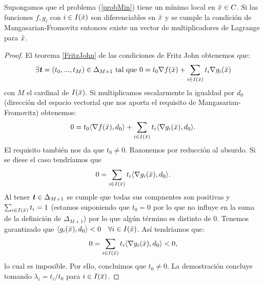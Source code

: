 		\begin{teoremaBox}
		Supongamos que el problema (\ref{probMin}) tiene un mínimo local en $ \bar{x} \in C $. Si las funciones $ f, g_i $ con $ i \in I(\bar{x}) $ son diferenciables en $ \bar{x} $ y se cumple la condición de Mangasarian-Fromovitz entonces existe un vector de multiplicadores de Lagrange para $ \bar{x} $.
		\end{teoremaBox} 
	
		\begin{proof}
		El teorema \ref{FritzJohn} de las condiciones de Fritz John obtenemos que:
		\[
		\exists \textbf{\emph{t}} = (t_0, ..., t_{M})\in \Delta_{M+1}  \text{ tal que }0 = t_0 \nabla f(\bar{x}) + \sum_{i \in I(\bar{x})}  t_i \nabla g_i (\bar{x})
		\]		
		con $ M $ el cardinal de $ I(\bar{x}) $. Si multiplicamos escalarmente la igualdad por $ d_0 $ (dirección del espacio vectorial que nos aporta el requisito de  Mangasarian-Fromovitz) obtenemos:
		\[
		0 = t_0 \langle \nabla f(\bar{x}), d_0 \rangle + \sum_{i \in I(\bar{x})}  t_i \langle \nabla g_i (\bar{x}), d_0 \rangle.
		\]
		El requisito también nos da que $ t_0 \neq 0$. Razonemos por reducción al absurdo. Si se diese el caso tendríamos que
		\[
		0 = \sum_{i \in I(\bar{x})}  t_i \langle \nabla g_i (\bar{x}), d_0 \rangle.
		\]
		Al tener $ \textbf{\emph{t}} \in \Delta_{M+1} $ se cumple que todas sus compnentes son positivas y $ \sum_{i \in I(\bar{x})}  t_i = 1 $ (estamos suponiendo que $ t_0 = 0 $ por lo que no influye en la suma de la definición de $ \Delta_{M+1} $) por lo que algún término es distinto de 0. Tenemos garantizado que $  \langle g_i (\bar{x}), d_0 \rangle < 0 \quad \forall i \in I(\bar{x}) $. Así tendríamos que:
			\[
		0 = \sum_{i \in I(\bar{x})}  t_i \langle \nabla g_i (\bar{x}), d_0 \rangle < 0,
		\]
		lo cual es imposible. Por ello, concluimos que $ t_0 \neq 0 $. La demostración concluye tomando $ \lambda_i = t_i / t_0 $ para $ i \in I(\bar{x}) $.
		\end{proof}
		